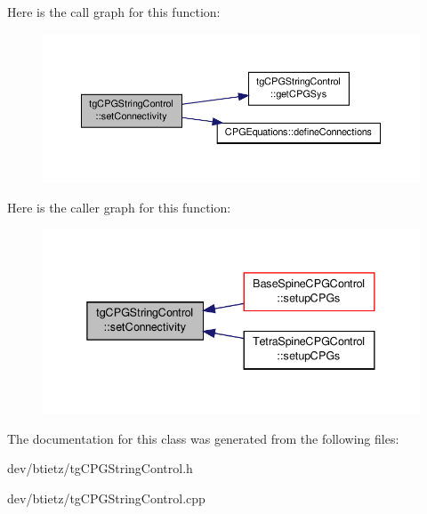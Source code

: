 Here is the call graph for this function\-:\nopagebreak
\begin{figure}[H]
\begin{center}
\leavevmode
\includegraphics[width=350pt]{classtg_c_p_g_string_control_a1df89c0bb265cfc32135ba85328cb15f_cgraph}
\end{center}
\end{figure}




Here is the caller graph for this function\-:\nopagebreak
\begin{figure}[H]
\begin{center}
\leavevmode
\includegraphics[width=338pt]{classtg_c_p_g_string_control_a1df89c0bb265cfc32135ba85328cb15f_icgraph}
\end{center}
\end{figure}




The documentation for this class was generated from the following files\-:\begin{DoxyCompactItemize}
\item 
dev/btietz/tg\-C\-P\-G\-String\-Control.\-h\item 
dev/btietz/tg\-C\-P\-G\-String\-Control.\-cpp\end{DoxyCompactItemize}
